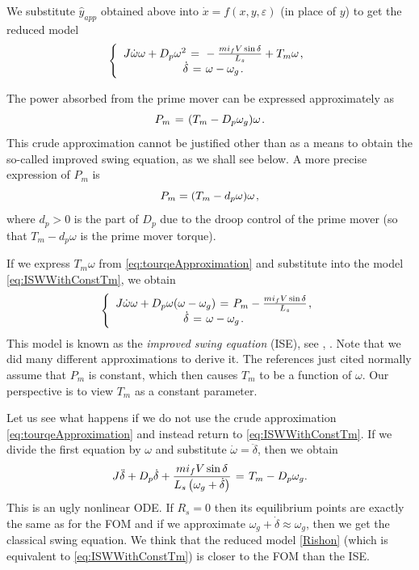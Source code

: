 \documentclass[conference]{IEEEtran}
\newcommand{\BE}{\begin{equation}}
\newcommand{\BEQ}[1]{\BE\label{#1}} %
\renewcommand{\o}    {{\omega}}
\newcommand{\e}      {{\varepsilon}}
\newcommand{\m}      {{\hbox{\hskip 1pt}}}
\begin{document}
We substitute $\hat{y}_{app}$ obtained above into $\dot{x}=f(x,y,\e)$
(in place of $y$) to get the reduced model
\BEQ{eq:ISWWithConstTm}
 \left\{ \begin{array}{c} J\dot{\o}\o+D_p\o^2 \m=\m -\frac{mi_f V
   \sin\delta}{L_s}+T_m\o \m,\\ \dot{\delta} \m=\m \o-\o_g \m.
   \end{array}\right.
  \end{equation}
   
The power absorbed from the prime mover can be expressed approximately as \vspace{-2mm}
\BEQ{eq:tourqeApproximation}
P_m \m=\m (T_m-D_p \o_g)\o \m.
 \end{equation}
This crude approximation cannot be justified other than as a means to obtain the so-called improved swing equation, as we shall see below. A more precise expression of $P_m$ is 
$$P_m=(T_m-d_p\o)\o \m,$$
where $d_p>0$ is the part of $D_p$ due to the droop control of the prime mover (so that $T_m-d_p\o$ is the prime mover torque). 
 
If we express $T_m\o$ from \eqref{eq:tourqeApproximation}
and substitute into the model \eqref{eq:ISWWithConstTm}, we obtain
$$ \left\{ \begin{array}{c} J\dot{\o}\o+D_p\o(\o-\o_g) \m=\m P_m - 
   \frac{mi_f V\sin\delta}{L_s} \m,\\ \dot{\delta} \m=\m \o-\o_g \m.
   \end{array}\right.$$
This model is known as the {\em improved swing equation} (ISE), see
\cite{DePersiSchaft:16}, \cite{ZhouOhsawa2009}. Note that we did many
different approximations to derive it. The references just cited
normally assume that $P_m$ is constant, which then causes $T_m$ to be
a function of $\o$. Our perspective is to view $T_m$ as a constant
parameter.

Let us see what happens if we do not use the crude approximation
\eqref{eq:tourqeApproximation} and instead return to
\eqref{eq:ISWWithConstTm}. If we divide the first equation by $\o$ and
substitute $\dot{\o} = \ddot{\delta}$, then we obtain
\begin{equation} \label{Rishon}
   J\ddot{\delta}+D_p \dot{\delta} + \frac{mi_f V \sin \delta}{L_s 
   \left(\o_g + \dot{\delta}\right)} \m=\m T_m - D_p \o_g .
\end{equation}
This is an ugly nonlinear ODE. If $R_s=0$ then its equilibrium points
are exactly the same as for the FOM and if we approximate
$\o_g+\dot{\delta}\approx\o_g$, then we get the classical swing
equation. We think that the reduced model \eqref{Rishon} (which is
equivalent to \eqref{eq:ISWWithConstTm}) is closer to the FOM than the
ISE.
\end{document}

